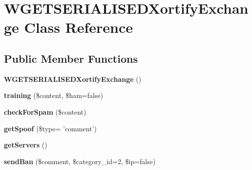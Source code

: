 \hypertarget{class_w_g_e_t_s_e_r_i_a_l_i_s_e_d_xortify_exchange}{\section{W\-G\-E\-T\-S\-E\-R\-I\-A\-L\-I\-S\-E\-D\-Xortify\-Exchange Class Reference}
\label{class_w_g_e_t_s_e_r_i_a_l_i_s_e_d_xortify_exchange}
}
\subsection*{Public Member Functions}
\begin{DoxyCompactItemize}
\item 
\hypertarget{class_w_g_e_t_s_e_r_i_a_l_i_s_e_d_xortify_exchange_a9cb496f47caedcb1ec206e75111c3304}{{\bfseries W\-G\-E\-T\-S\-E\-R\-I\-A\-L\-I\-S\-E\-D\-Xortify\-Exchange} ()}\label{class_w_g_e_t_s_e_r_i_a_l_i_s_e_d_xortify_exchange_a9cb496f47caedcb1ec206e75111c3304}

\item 
\hypertarget{class_w_g_e_t_s_e_r_i_a_l_i_s_e_d_xortify_exchange_a97c0277cbfcc0c249e5b5b0c57bfa6e4}{{\bfseries training} (\$content, \$ham=false)}\label{class_w_g_e_t_s_e_r_i_a_l_i_s_e_d_xortify_exchange_a97c0277cbfcc0c249e5b5b0c57bfa6e4}

\item 
\hypertarget{class_w_g_e_t_s_e_r_i_a_l_i_s_e_d_xortify_exchange_a8ca0817a1462feb0a36af577577880ea}{{\bfseries check\-For\-Spam} (\$content)}\label{class_w_g_e_t_s_e_r_i_a_l_i_s_e_d_xortify_exchange_a8ca0817a1462feb0a36af577577880ea}

\item 
\hypertarget{class_w_g_e_t_s_e_r_i_a_l_i_s_e_d_xortify_exchange_ab25316aa3ff6fe74f6ee390e07f6b5f8}{{\bfseries get\-Spoof} (\$type= 'comment')}\label{class_w_g_e_t_s_e_r_i_a_l_i_s_e_d_xortify_exchange_ab25316aa3ff6fe74f6ee390e07f6b5f8}

\item 
\hypertarget{class_w_g_e_t_s_e_r_i_a_l_i_s_e_d_xortify_exchange_ab8296ccd20532cb9badbf81238ee6e52}{{\bfseries get\-Servers} ()}\label{class_w_g_e_t_s_e_r_i_a_l_i_s_e_d_xortify_exchange_ab8296ccd20532cb9badbf81238ee6e52}

\item 
\hypertarget{class_w_g_e_t_s_e_r_i_a_l_i_s_e_d_xortify_exchange_a62620079f2aa924fdc8e0effca207fc2}{{\bfseries send\-Ban} (\$comment, \$category\-\_\-id=2, \$ip=false)}\label{class_w_g_e_t_s_e_r_i_a_l_i_s_e_d_xortify_exchange_a62620079f2aa924fdc8e0effca207fc2}


\end{DoxyCompactItemize}
